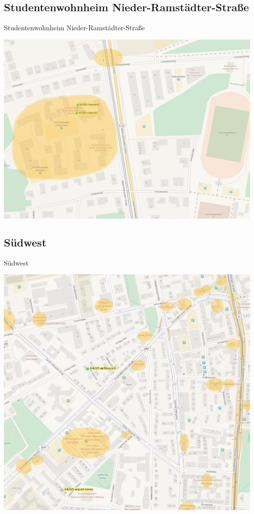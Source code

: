 \documentclass{beamer}
\begin{document}
\subsection{Studentenwohnheim Nieder-Ramstädter-Straße}
\begin{frame}{Studentenwohnheim Nieder-Ramstädter-Straße}
\begin{center}
\includegraphics[height=0.8\textheight]{studwohn-nr2}
\end{center}
\end{frame}

\subsection{Südwest}
\begin{frame}{Südwest}
\begin{center}
\includegraphics[height=0.8\textheight]{suedwest2}
\end{center}
\end{frame}
\end{document}
